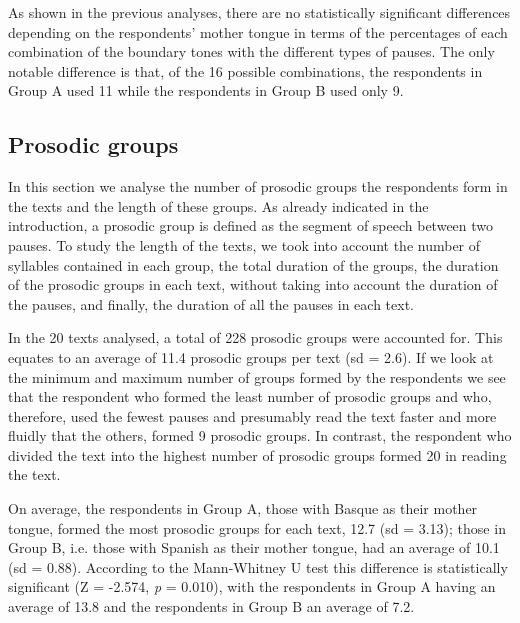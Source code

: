 \documentclass[output=paper]{langsci/langscibook}
\begin{document}
  As shown in the previous analyses, there are no statistically significant differences depending on the respondents’ mother tongue in terms of the percentages of each combination of the boundary tones with the different types of pauses. The only notable difference is that, of the 16 possible combinations, the respondents in Group A used 11 while the respondents in Group B used only 9.

\subsection{Prosodic groups} 

  In this section we analyse the number of prosodic groups the respondents form in the texts and the length of these groups. As already indicated in the introduction, a prosodic group is defined as the segment of speech between two pauses. To study the length of the texts, we took into account the number of syllables contained in each group, the total duration of the groups, the duration of the prosodic groups in each text, without taking into account the duration of the pauses, and finally, the duration of all the pauses in each text.

  In the 20 texts analysed, a total of 228 prosodic groups were accounted for. This equates to an average of 11.4 prosodic groups per text (sd = 2.6). If we look at the minimum and maximum number of groups formed by the respondents we see that the respondent who formed the least number of prosodic groups and who, therefore, used the fewest pauses and presumably read the text faster and more fluidly that the others, formed 9 prosodic groups. In contrast, the respondent who divided the text into the highest number of prosodic groups formed 20 in reading the text.

  On average, the respondents in Group A, those with Basque as their mother tongue, formed the most prosodic groups for each text, 12.7 (sd = 3.13); those in Group B, i.e. those with Spanish as their mother tongue, had an average of 10.1 (sd = 0.88). According to the Mann-Whitney U test this difference is statistically significant (Z = -2.574, \textit{p} = 0.010), with the respondents in Group A having an average of 13.8 and the respondents in Group B an average of 7.2.
\end{document}
